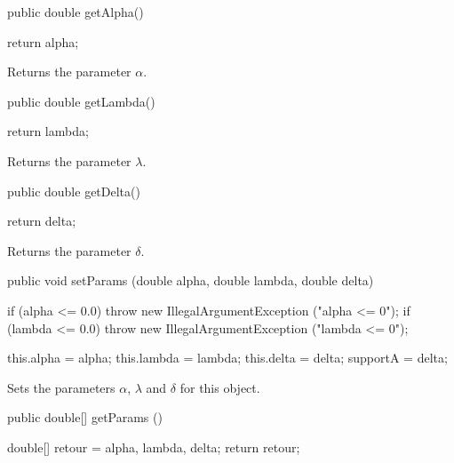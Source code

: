 \begin{htmlonly}
\end{htmlonly}
\begin{code}

   public double getAlpha()\begin{hide} {
      return alpha;
   }\end{hide}
\end{code}
  \begin{tabb} Returns the parameter $\alpha$.
  \end{tabb}
\begin{code}

   public double getLambda()\begin{hide} {
      return lambda;
   }\end{hide}
\end{code}
  \begin{tabb} Returns the parameter $\lambda$.
  \end{tabb}
\begin{code}

   public double getDelta()\begin{hide} {
      return delta;
   }\end{hide}
\end{code}
  \begin{tabb} Returns the parameter $\delta$.
  \end{tabb}
\begin{code}

   public void setParams (double alpha, double lambda, double delta)\begin{hide} {
      if (alpha <= 0.0)
        throw new IllegalArgumentException ("alpha <= 0");
      if (lambda <= 0.0)
        throw new IllegalArgumentException ("lambda <= 0");

      this.alpha  = alpha;
      this.lambda = lambda;
      this.delta  = delta;
      supportA = delta;
   }\end{hide}
\end{code}
  \begin{tabb} Sets the parameters $\alpha$, $\lambda$ and $\delta$ for this
   object.
  \end{tabb}
\begin{code}

   public double[] getParams ()\begin{hide} {
      double[] retour = {alpha, lambda, delta};
      return retour;
   }\end{hide}
\end{code}
